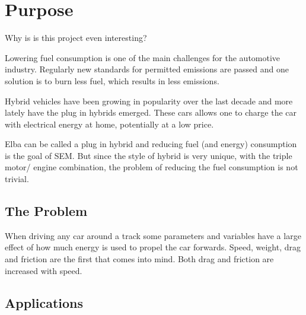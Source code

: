 \chapter{Purpose}

Why is is this project even interesting?

Lowering fuel consumption is one of the main challenges for the automotive 
industry. Regularly new standards for permitted emissions are passed and  
one solution is to burn less fuel, which results in less emissions.

Hybrid vehicles have been growing in popularity over the last decade and 
more lately have the plug in hybrids emerged. These cars allows one 
to charge the car with electrical energy at home, potentially at a low price.

Elba can be called a plug in hybrid and reducing fuel (and energy) consumption is the goal
of SEM\@. But since the style of hybrid is very unique, with the triple motor/ engine
combination, the problem of reducing the fuel consumption is not trivial. 

\section{The Problem}
When driving any car around a track some parameters and variables have a large effect of
how much energy is used to propel the car forwards. Speed, weight, drag and friction are
the first that comes into mind. Both drag and friction are increased with speed.

\section{Applications}
